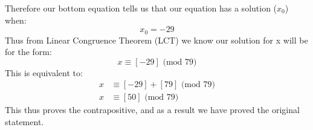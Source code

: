 \documentclass[11pt]{article}
\begin{document}
Therefore our bottom equation tells us that our equation has a solution ($x_0$) when:
\[  x_0 = -29 \]
Thus from Linear Congruence Theorem (LCT) we know our solution for x will be for the form:
\[ x \equiv [-29] \text{ (mod 79)} \]
This is equivalent to:
\begin{align*}
 x & \equiv [-29] + [79] \text{ (mod 79)} \\
 x & \equiv [50]  \text{ (mod 79)} 
\end{align*}
This thus proves the contrapositive, and as a result we have proved the original statement.
\end{document}
